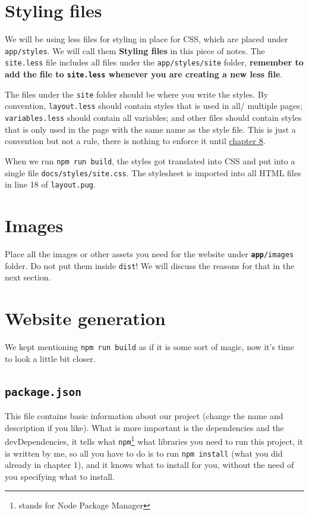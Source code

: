 \section{Styling files}

We will be using less files for styling in place for CSS, which are placed under \texttt{app/styles}. We will call them \textbf{Styling files} in this piece of notes. The \texttt{site.less} file includes all files under the \texttt{app/styles/site} folder, \textbf{remember to add the file to \texttt{site.less} whenever you are creating a new less file}. 

The files under the \texttt{site} folder should be where you write the styles. By convention, \texttt{layout.less} should contain styles that is used in all/ multiple pages; \texttt{variables.less} should contain all variables; and other files should contain styles that is only used in the page with the same name as the style file. This is just a convention but not a rule, there is nothing to enforce it until \hyperref[sec:confinestyles]{chapter 8}.

When we run \texttt{npm run build}, the styles got translated into CSS and put into a single file \texttt{docs/styles/site.css}. The stylesheet is imported into all HTML files in line 18 of \texttt{layout.pug}.

\section{Images}

Place all the images or other assets you need for the website under \texttt{\textbf{app}/images} folder. Do not put them inside \texttt{dist}! We will discuss the reasons for that in the next section. 

\section{Website generation}

We kept mentioning \texttt{npm run build} as if it is some sort of magic, now it's time to look a little bit closer.

\subsection{\texttt{package.json}}

This file contains basic information about our project (change the name and description if you like). What is more important is the dependencies and the devDependencies, it tells what \texttt{npm}\footnote{stands for Node Package Manager} what libraries you need to run this project, it is written by me, so all you have to do is to run \texttt{npm install} (what you did already in chapter 1), and it knows what to install for you, without the need of you specifying what to install.

